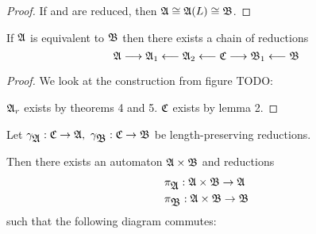 \begin{proof}
If  and  are reduced, then $\mbox{$\mathfrak{A}$} \cong \mbox{$\mathfrak{A}$}(L) \cong \mbox{$\mathfrak{B}$}$.
\end{proof}

\begin{corollary}
If $\mbox{$\mathfrak{A}$}$ is equivalent to $\mbox{$\mathfrak{B}$}$ then there exists a chain of reductions
\[ \mbox{$\mathfrak{A}$} \longrightarrow \mbox{$\mathfrak{A}$}_1 \longleftarrow \mbox{$\mathfrak{A}$}_2 \longleftarrow \mbox{$\mathfrak{C}$}
\longrightarrow \mbox{$\mathfrak{B}$}_1 \longleftarrow \mbox{$\mathfrak{B}$} \]
\end{corollary}

\begin{proof}
We look at the construction from figure TODO:

\begin{center}
\end{center}

$\mbox{$\mathfrak{A}$}_r$ exists by theorems 4 and 5. $\mbox{$\mathfrak{C}$}$ exists by lemma 2.
\end{proof}

\begin{lemma}
Let $\gamma_{\fa{A}} : \fa{C} \to \fa{A},\ \gamma_{\fa{B}} : \fa{C} \to \fa{B}$
be length-preserving reductions.

Then there exists an automaton $\mbox{$\mathfrak{A}$} \times \mbox{$\mathfrak{B}$}$ and reductions
\begin{eqnarray*}
& \pi_{\mbox{$\mathfrak{A}$}} : \mbox{$\mathfrak{A}$} \times \mbox{$\mathfrak{B}$} \to \mbox{$\mathfrak{A}$} \\
& \pi_{\mbox{$\mathfrak{B}$}} : \mbox{$\mathfrak{A}$} \times \mbox{$\mathfrak{B}$} \to \mbox{$\mathfrak{B}$}
\end{eqnarray*}
such that the following diagram commutes:

\begin{center}
\end{center}
\end{lemma}

